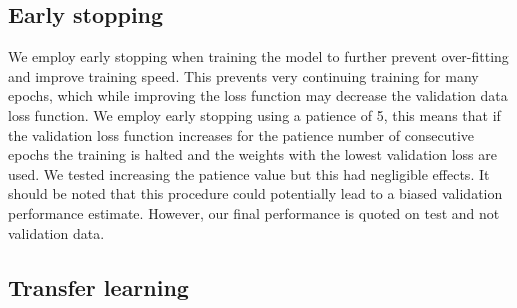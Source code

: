 \documentclass[NOTE, disdraft=true, UKenglish]{\DISCDTLATEXPATH UCLCDTDISdoc}
\begin{document}
\subsection{Early stopping}
We employ early stopping \cite{keras-docs} when training the model to further prevent over-fitting and improve training speed. This prevents very continuing training for many epochs, which while improving the loss function may decrease the validation data loss function. We employ early stopping using a patience of 5, this means that if the validation loss function increases for the patience number of consecutive epochs the training is halted and the weights with the lowest validation loss are used. We tested increasing the patience value but this had negligible effects.
It should be noted that this procedure could potentially lead to a biased validation performance estimate. However, our final performance is quoted on test and not validation data.
\subsection{Transfer learning}
\end{document}
